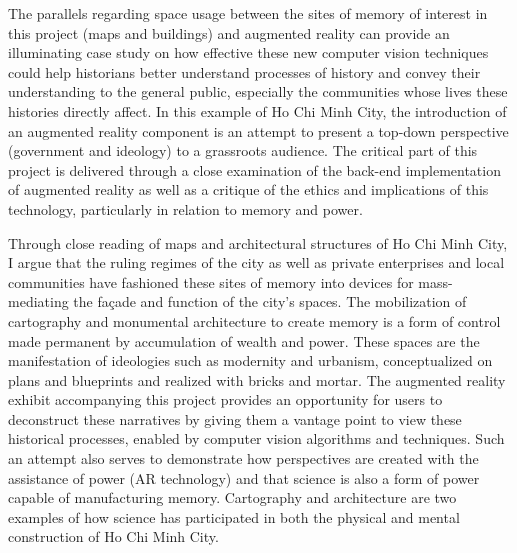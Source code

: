 The parallels regarding space usage between the sites of memory of interest in this project (maps and buildings) and augmented reality can provide an illuminating case study on how effective these new computer vision techniques could help historians better understand processes of history and convey their understanding to the general public, especially the communities whose lives these histories directly affect. In this example of Ho Chi Minh City, the introduction of an augmented reality component is an attempt to present a top-down perspective (government and ideology) to a grassroots audience. The critical part of this project is delivered through a close examination of the back-end implementation of augmented reality as well as a critique of the ethics and implications of this technology, particularly in relation to memory and power.

Through close reading of maps and architectural structures of Ho Chi Minh City, I argue that the ruling regimes of the city as well as private enterprises and local communities have fashioned these sites of memory into devices for mass-mediating the façade and function of the city’s spaces. The mobilization of cartography and monumental architecture to create memory is a form of control made permanent by accumulation of wealth and power. These spaces are the manifestation of ideologies such as modernity and urbanism, conceptualized on plans and blueprints and realized with bricks and mortar. The augmented reality exhibit accompanying this project provides an opportunity for users to deconstruct these narratives by giving them a vantage point to view these historical processes, enabled by computer vision algorithms and techniques. Such an attempt also serves to demonstrate how perspectives are created with the assistance of power (AR technology) and that science is also a form of power capable of manufacturing memory. Cartography and architecture are two examples of how science has participated in both the physical and mental construction of Ho Chi Minh City.

